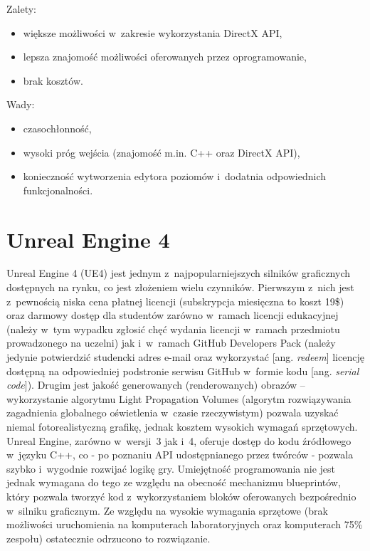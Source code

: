 {\raggedright Zalety:
\begin{itemize}
\item większe możliwości w~zakresie wykorzystania DirectX API,
\item lepsza znajomość możliwości oferowanych przez oprogramowanie,
\item brak kosztów.
\end{itemize}

Wady:
\begin{itemize}
\item czasochłonność,
\item wysoki próg wejścia (znajomość m.in. C++ oraz DirectX API),
\item konieczność wytworzenia edytora poziomów i~dodatnia odpowiednich funkcjonalności.
\end{itemize}
}
\section{Unreal Engine 4}
Unreal Engine 4 (UE4) jest jednym z~najpopularniejszych silników graficznych dostępnych na rynku, co jest złożeniem wielu czynników. Pierwszym z~nich jest z~pewnością niska cena płatnej licencji (subskrypcja miesięczna to koszt 19\$) oraz darmowy dostęp dla studentów zarówno w~ramach licencji edukacyjnej (należy w~tym wypadku zgłosić chęć wydania licencji w~ramach przedmiotu prowadzonego na uczelni) jak i~w~ramach GitHub Developers Pack (należy jedynie potwierdzić studencki adres e-mail oraz wykorzystać [ang. \emph{redeem}] licencję dostępną na odpowiedniej podstronie serwisu GitHub w~formie kodu [ang. \emph{serial code}]). Drugim jest jakość generowanych (renderowanych) obrazów -- wykorzystanie algorytmu Light Propagation Volumes (algorytm rozwiązywania zagadnienia globalnego oświetlenia w~czasie rzeczywistym) pozwala uzyskać niemal fotorealistyczną grafikę, jednak kosztem wysokich wymagań sprzętowych.
Unreal Engine, zarówno w~wersji~3 jak i~4, oferuje dostęp do kodu źródłowego w~języku C++, co - po poznaniu API udostępnianego przez twórców - pozwala szybko i~wygodnie rozwijać logikę gry. Umiejętność programowania nie jest jednak wymagana do tego ze względu na obecność mechanizmu blueprintów, który pozwala tworzyć kod z~wykorzystaniem bloków oferowanych bezpośrednio w~silniku graficznym.
Ze względu na wysokie wymagania sprzętowe (brak możliwości uruchomienia na komputerach laboratoryjnych oraz komputerach 75\% zespołu) ostatecznie odrzucono to rozwiązanie.\\

